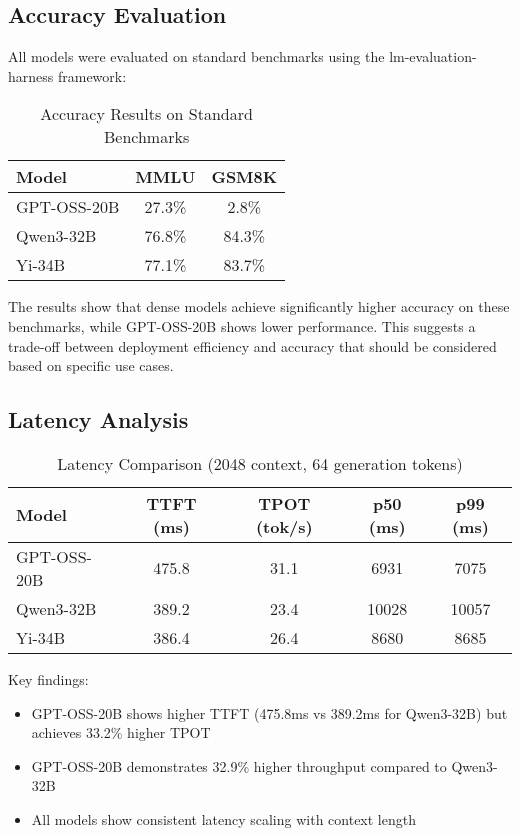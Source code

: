 \documentclass[11pt]{article}
\begin{document}
\subsection{Accuracy Evaluation}

All models were evaluated on standard benchmarks using the lm-evaluation-harness framework:

\begin{table}[h]
\centering
\caption{Accuracy Results on Standard Benchmarks}
\begin{tabular}{lcc}
\toprule
Model & MMLU & GSM8K \\
\midrule
GPT-OSS-20B & 27.3\% & 2.8\% \\
Qwen3-32B & 76.8\% & 84.3\% \\
Yi-34B & 77.1\% & 83.7\% \\
\bottomrule
\end{tabular}
\end{table}

The results show that dense models achieve significantly higher accuracy on these benchmarks, while GPT-OSS-20B shows lower performance. This suggests a trade-off between deployment efficiency and accuracy that should be considered based on specific use cases.

\subsection{Latency Analysis}

\begin{table}[h]
\centering
\caption{Latency Comparison (2048 context, 64 generation tokens)}
\begin{tabular}{lcccc}
\toprule
Model & TTFT (ms) & TPOT (tok/s) & p50 (ms) & p99 (ms) \\
\midrule
GPT-OSS-20B & 475.8 & 31.1 & 6931 & 7075 \\
Qwen3-32B & 389.2 & 23.4 & 10028 & 10057 \\
Yi-34B & 386.4 & 26.4 & 8680 & 8685 \\
\bottomrule
\end{tabular}
\end{table}

Key findings:
\begin{itemize}
    \item GPT-OSS-20B shows higher TTFT (475.8ms vs 389.2ms for Qwen3-32B) but achieves 33.2\% higher TPOT
    \item GPT-OSS-20B demonstrates 32.9\% higher throughput compared to Qwen3-32B
    \item All models show consistent latency scaling with context length
\end{itemize}
\end{document}
